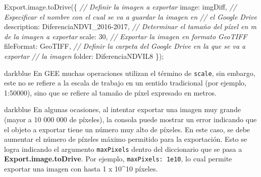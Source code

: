 \documentclass[
  12pt,
  letterpaper,
  twoside]{book}
\newenvironment{Shaded}{\begin{snugshade}}{\end{snugshade}}
\newcommand{\AttributeTok}[1]{\textcolor[rgb]{0.48,0.12,0.64}{#1}}
\newcommand{\CommentTok}[1]{\textcolor[rgb]{0.24,0.58,0.00}{\textit{#1}}}
\newcommand{\DataTypeTok}[1]{\textcolor[rgb]{0.00,0.00,0.00}{#1}}
\newcommand{\DecValTok}[1]{\textcolor[rgb]{0.28,0.53,0.93}{#1}}
\newcommand{\FunctionTok}[1]{\textcolor[rgb]{0.48,0.12,0.64}{#1}}
\newcommand{\NormalTok}[1]{#1}
\newcommand{\OperatorTok}[1]{\textcolor[rgb]{0.00,0.00,0.00}{#1}}
\newcommand{\StringTok}[1]{\textcolor[rgb]{0.87,0.29,0.22}{#1}}
\newcommand\boldpurple[1]{\textcolor{darkpurple}{\textbf{#1}}}
\begin{document}
\begin{Shaded}
\begin{Highlighting}[]
\NormalTok{Export}\OperatorTok{.}\AttributeTok{image}\OperatorTok{.}\FunctionTok{toDrive}\NormalTok{(\{}
  \CommentTok{// Definir la imagen a exportar}
  \DataTypeTok{image}\OperatorTok{:}\NormalTok{ imgDiff}\OperatorTok{,}
  \CommentTok{// Especificar el nombre con el cual se va a guardar la imagen en}
  \CommentTok{// el Google Drive}
  \DataTypeTok{description}\OperatorTok{:} \StringTok{\textquotesingle{}DiferenciaNDVI\_2016{-}2017\textquotesingle{}}\OperatorTok{,}
  \CommentTok{// Determinar el tamaño del píxel en m de la imagen a exportar}
  \DataTypeTok{scale}\OperatorTok{:} \DecValTok{30}\OperatorTok{,}
  \CommentTok{// Exportar la imagen en formato GeoTIFF}
  \DataTypeTok{fileFormat}\OperatorTok{:} \StringTok{\textquotesingle{}GeoTIFF\textquotesingle{}}\OperatorTok{,}
  \CommentTok{// Definir la carpeta del Google Drive en la que se va a exportar}
  \CommentTok{// la imagen}
  \DataTypeTok{folder}\OperatorTok{:} \StringTok{\textquotesingle{}DiferenciaNDVIL8\textquotesingle{}}
\NormalTok{\})}\OperatorTok{;} 
\end{Highlighting}
\end{Shaded}

\begin{bluebox2}

\begin{awesomeblock}{5pt}{\faLightbulb}{darkblue}
En GEE muchas operaciones utilizan el término de \texttt{scale}, sin embargo, este no se refiere a la escala de trabajo en un sentido tradicional (por ejemplo, 1:50000), sino que se refiere al tamaño de píxel expresado en metros.

\end{awesomeblock}

\end{bluebox2}

\begin{bluebox2}

\begin{awesomeblock}{5pt}{\faLightbulb}{darkblue}
En algunas ocasiones, al intentar exportar una imagen muy grande (mayor a 10 000 000 de píxeles), la consola puede mostrar un error indicando que el objeto a exportar tiene un número muy alto de píxeles. En este caso, se debe aumentar el número de píxeles máximo permitido para la exportación. Esto se logra indicando el argumento \texttt{maxPixels} dentro del diccionario que se pasa a \boldpurple{Export.image.toDrive}. Por ejemplo, \texttt{maxPixels:\ 1e10}, lo cual permite exportar una imagen con hasta 1 x 10\^{}10 píxeles.

\end{awesomeblock}

\end{bluebox2}
\end{document}
